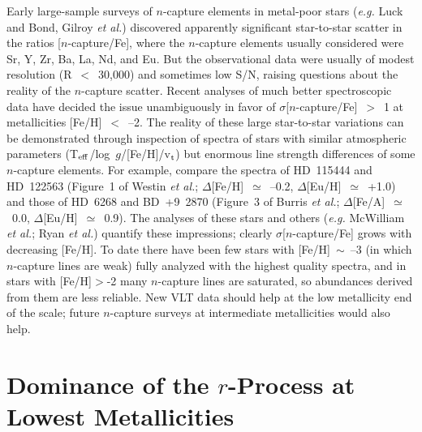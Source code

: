 \documentclass{ws-p8-50x6-00}
\begin{document}
Early large-sample surveys of $n$-capture elements in metal-poor stars 
({\it e.g.} Luck and Bond\cite{LB85}, Gilroy {\it et al.}\cite{Gi88}) 
discovered apparently significant star-to-star scatter in the ratios 
[$n$-capture/Fe], where the $n$-capture elements usually considered were 
Sr, Y, Zr, Ba, La, Nd, and Eu.  
But the observational data were usually of modest resolution (R~$<$~30,000) 
and sometimes low S/N, raising questions about the reality of the 
$n$-capture scatter.  
Recent analyses of much better spectroscopic data have decided the issue 
unambiguously in favor of $\sigma$[$n$-capture/Fe]~$>$~1 at metallicities 
[Fe/H]~$<$~--2.
The reality of these large star-to-star variations can be demonstrated
through inspection of spectra of stars with similar atmospheric parameters 
(T$_{\rm eff}$/log~$g$/[Fe/H]/v$_{\rm t}$) but enormous line 
strength differences of some $n$-capture elements.  
For example, compare the spectra of HD~115444 and HD~122563 
(Figure~1 of Westin {\it et al.}\cite{We00}; $\Delta$[Fe/H]~$\simeq$~--0.2, 
$\Delta$[Eu/H]~$\simeq$~+1.0) and those of HD~6268 and BD~+9~2870 
(Figure~3 of Burris {\it et al.}\cite{Bu00}; $\Delta$[Fe/A]~$\simeq$~0.0, 
$\Delta$[Eu/H]~$\simeq$~0.9). 
The analyses of these stars and others ({\it e.g.} McWilliam 
{\it et al.}\cite{Mc95}; Ryan {\it et al.}\cite{Ry96}) quantify these 
impressions; clearly $\sigma$[$n$-capture/Fe] grows with decreasing [Fe/H].  
To date there have been few stars with [Fe/H]~$\sim$~--3 (in which 
$n$-capture lines are weak) fully analyzed with the highest quality spectra,
and in stars with [Fe/H]$>$-2 many $n$-capture lines are saturated,
so abundances derived from them are less reliable.  
New VLT data should help at the low metallicity end of the scale; 
future $n$-capture surveys at intermediate metallicities would also help.






\section{Dominance of the $r$-Process at Lowest Metallicities}
 
\end{document}
